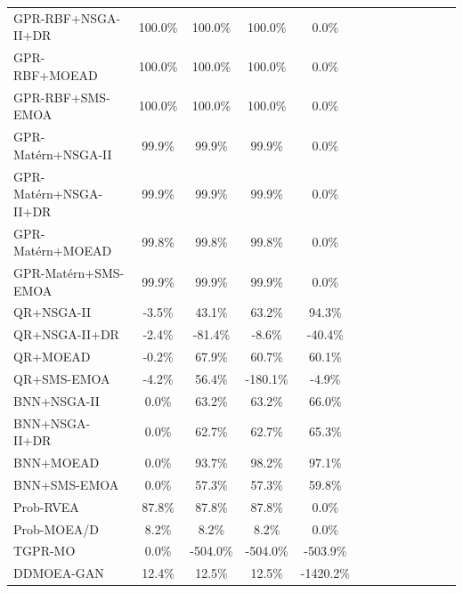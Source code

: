 \begin{table}[htbp]
{\begin{tabular}{l c c c c c c c c c c c c}
GPR-RBF+NSGA-II+DR & 100.0\% & 100.0\% & 100.0\% & 0.0\% &  &  &  &  &  &  &  &  \\
GPR-RBF+MOEAD & 100.0\% & 100.0\% & 100.0\% & 0.0\% &  &  &  &  &  &  &  &  \\
GPR-RBF+SMS-EMOA & 100.0\% & 100.0\% & 100.0\% & 0.0\% &  &  &  &  &  &  &  &  \\
GPR-Mat\'ern+NSGA-II & 99.9\% & 99.9\% & 99.9\% & 0.0\% &  &  &  &  &  &  &  &  \\
GPR-Mat\'ern+NSGA-II+DR & 99.9\% & 99.9\% & 99.9\% & 0.0\% &  &  &  &  &  &  &  &  \\
GPR-Mat\'ern+MOEAD & 99.8\% & 99.8\% & 99.8\% & 0.0\% &  &  &  &  &  &  &  &  \\
GPR-Mat\'ern+SMS-EMOA & 99.9\% & 99.9\% & 99.9\% & 0.0\% &  &  &  &  &  &  &  &  \\
QR+NSGA-II & -3.5\% & 43.1\% & 63.2\% & 94.3\% &  &  &  &  &  &  &  &  \\
QR+NSGA-II+DR & -2.4\% & -81.4\% & -8.6\% & -40.4\% &  &  &  &  &  &  &  &  \\
QR+MOEAD & -0.2\% & 67.9\% & 60.7\% & 60.1\% &  &  &  &  &  &  &  &  \\
QR+SMS-EMOA & -4.2\% & 56.4\% & -180.1\% & -4.9\% &  &  &  &  &  &  &  &  \\
BNN+NSGA-II & 0.0\% & 63.2\% & 63.2\% & 66.0\% &  &  &  &  &  &  &  &  \\
BNN+NSGA-II+DR & 0.0\% & 62.7\% & 62.7\% & 65.3\% &  &  &  &  &  &  &  &  \\
BNN+MOEAD & 0.0\% & 93.7\% & 98.2\% & 97.1\% &  &  &  &  &  &  &  &  \\
BNN+SMS-EMOA & 0.0\% & 57.3\% & 57.3\% & 59.8\% &  &  &  &  &  &  &  &  \\
Prob-RVEA & 87.8\% & 87.8\% & 87.8\% & 0.0\% &  &  &  &  &  &  &  &  \\
Prob-MOEA/D & 8.2\% & 8.2\% & 8.2\% & 0.0\% &  &  &  &  &  &  &  &  \\
TGPR-MO & 0.0\% & -504.0\% & -504.0\% & -503.9\% &  &  &  &  &  &  &  &  \\
DDMOEA-GAN & 12.4\% & 12.5\% & 12.5\% & -1420.2\% &  &  &  &  &  &  &  &  \\
\hline
\end{tabular}
}
\end{table}
